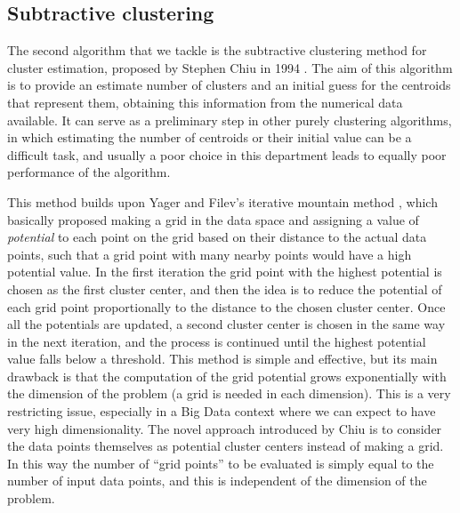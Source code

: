 \subsection{Subtractive clustering}

The second algorithm that we tackle is the subtractive clustering method for cluster estimation, proposed by Stephen Chiu in 1994 \cite{chiu1994identification}. The aim of this algorithm is to provide an estimate number of clusters and an initial guess for the centroids that represent them, obtaining this information from the numerical data available. It can serve as a preliminary step in other purely clustering algorithms, in which estimating the number of centroids or their initial value can be a difficult task, and usually a poor choice in this department leads to equally poor performance of the algorithm.

This method builds upon Yager and Filev's iterative mountain method \cite{yager1994approximate}, which basically proposed making a grid in the data space and assigning a value of \textit{potential} to each point on the grid based on their distance to the actual data points, such that a grid point with many nearby points would have a high potential value. In the first iteration the grid point with the highest potential is chosen as the first cluster center, and then the idea is to reduce the potential of each grid point proportionally to the distance to the chosen cluster center. Once all the potentials are updated, a second cluster center is chosen in the same way in the next iteration, and the process is continued until the highest potential value falls below a threshold. This method is simple and effective, but its main drawback is that the computation of the grid potential grows exponentially with the dimension of the problem (a grid is needed in each dimension). This is a very restricting issue, especially in a Big Data context where we can expect to have very high dimensionality. The novel approach introduced by Chiu is to consider the data points themselves as potential cluster centers instead of making a grid. In this way the number of ``grid points'' to be evaluated is simply equal to the number of input data points, and this is independent of the dimension of the problem.

